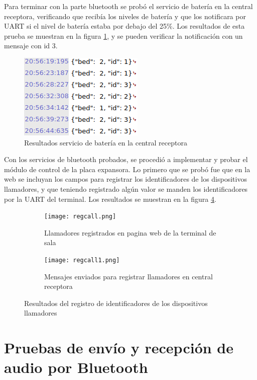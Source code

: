 Para terminar con la parte bluetooth se probó el servicio de batería en la central receptora, verificando que recibía los niveles de batería y que los notificara por UART si el nivel de batería estaba por debajo del 25\%. Los resultados de esta prueba se muestran en la figura \ref{fig:Pbas2}, y se pueden verificar la notificación con un mensaje con id 3.

\begin{figure}[htpb]
	\centering
	\includegraphics[scale=0.7]{./Figures/Pbas2.png}	
	\caption{Resultados servicio de batería en la central receptora}
	\label{fig:Pbas2}
\end{figure}

Con los servicios de bluetooth probados, se procedió a implementar y probar el módulo de control de la placa expansora. Lo primero que se probó fue que en la web se incluyan los campos para registrar los identificadores de los dispositivos llamadores, y que teniendo registrado algún valor se manden los identificadores por la UART del terminal. Los resultados se muestran en la figura \ref{fig:Pllam}.

\begin{figure}[htpb]
	\centering
   	\begin{subfigure}[b]{1\textwidth}
   		\centering
      	\texttt{[image: regcall.png]}
      	\caption{Llamadores registrados en pagina web de la terminal de sala}
      	\label{fig:PllamA}
   	\end{subfigure}%
   	\newline
   	\begin{subfigure}[b]{1\textwidth}
   		\centering
      	\texttt{[image: regcall1.png]}
      	\caption{Mensajes enviados para registrar llamadores en central receptora}
      	\label{fig:PllamB}
   	\end{subfigure}%
	\caption{Resultados del registro de identificadores de los dispositivos llamadores}
	\label{fig:Pllam}
\end{figure}

\section{Pruebas de envío y recepción de audio por Bluetooth}
\label{sec:pruebasACS}

